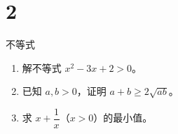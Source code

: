 \chapter{2}{不等式}

\begin{enumerate}
  \item 解不等式 $x^2-3x+2>0$。
  \item 已知 $a,b>0$，证明 $a+b\ge 2\sqrt{ab}$。
  \item 求 $x+\dfrac{1}{x}$（$x>0$）的最小值。
\end{enumerate}
